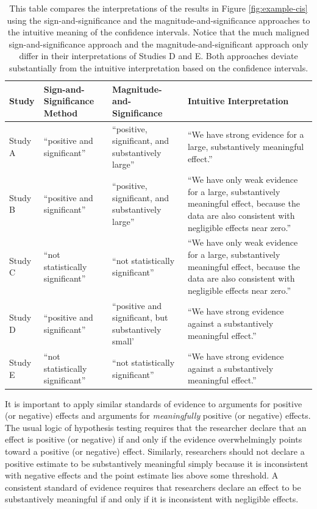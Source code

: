 \documentclass[12pt]{article}
\begin{document}
\singlespace
\renewcommand{\arraystretch}{1.5}
\begin{table}[H]
\begin{center}
\begin{scriptsize}
\begin{tabular}{|>{\centering\arraybackslash}m{.5in}>{\centering\arraybackslash}m{1.75in}>{\centering\arraybackslash}m{1.75in}>{\centering\arraybackslash}
m{1.75in}|}
\hline
Study & Sign-and-Significance Method & Magnitude-and-Significance & Intuitive Interpretation\\ 
\hline
Study A & ``positive and significant'' & ``positive, significant, and substantively large'' & ``We have strong evidence for a large, substantively meaningful effect.''\\
Study B & ``positive and significant'' & ``positive, significant, and substantively large'' & ``We have only weak evidence for a large, substantively meaningful effect, because the data are also consistent with negligible effects near zero.''\\
Study C & ``not statistically significant'' & ``not statistically significant'' & ``We have only weak evidence for a large, substantively meaningful effect, because the data are also consistent with negligible effects near zero.''\\
Study D & ``positive and significant'' & ``positive and significant, but substantively small' & ``We have strong evidence against a substantively meaningful effect.''\\
Study E & ``not statistically significant'' & ``not statistically significant'' & ``We have strong evidence against a substantively meaningful effect.''\\
\hline
\end{tabular}\caption{This table compares the interpretations of the results in Figure \ref{fig:example-cis} using the sign-and-significance and the magnitude-and-significance approaches to the intuitive meaning of the confidence intervals. Notice that the much maligned sign-and-significance approach and the magnitude-and-significant approach only differ in their interpretations of Studies D and E. Both approaches deviate substantially from the intuitive interpretation based on the confidence intervals.}\label{tab:example-cis}
\end{scriptsize}
\end{center}
\end{table}
\doublespace

It is important to apply similar standards of evidence to arguments for positive (or negative) effects and arguments for \emph{meaningfully} positive (or negative) effects. The usual logic of hypothesis testing requires that the researcher declare that an effect is positive (or negative) if and only if the evidence overwhelmingly points toward a positive (or negative) effect. Similarly, researchers should not declare a positive estimate to be substantively meaningful simply because it is inconsistent with negative effects and the point estimate lies above some threshold. A consistent standard of evidence requires that researchers declare an effect to be substantively meaningful if and only if it is inconsistent with negligible effects.
\end{document}

